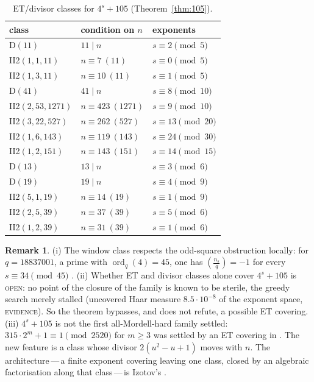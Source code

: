 \documentclass[11pt,reqno]{amsart}
\theoremstyle{definition}
\newtheorem{remark}[theorem]{Remark}
\newcommand{\ord}{\operatorname{ord}}
\newcommand{\leg}[2]{\left(\frac{#1}{#2}\right)}
\newcommand{\status}[1]{\textup{\textsc{#1}}}
\begin{document}
\begin{table}[ht]
\centering\small
\begin{tabular}{lll}
\toprule
class & condition on $n$ & exponents\\
\midrule
D$(11)$ & $11\mid n$ & $s\equiv 2\pmod{5}$ \\
II2$(1,1,11)$ & $n\equiv7\ (11)$ & $s\equiv 0\pmod{5}$ \\
II2$(1,3,11)$ & $n\equiv10\ (11)$ & $s\equiv 1\pmod{5}$ \\
D$(41)$ & $41\mid n$ & $s\equiv 8\pmod{10}$ \\
II2$(2,53,1271)$ & $n\equiv423\ (1271)$ & $s\equiv 9\pmod{10}$ \\
II2$(3,22,527)$ & $n\equiv262\ (527)$ & $s\equiv 13\pmod{20}$ \\
II2$(1,6,143)$ & $n\equiv119\ (143)$ & $s\equiv 24\pmod{30}$ \\
II2$(1,2,151)$ & $n\equiv143\ (151)$ & $s\equiv 14\pmod{15}$ \\
D$(13)$ & $13\mid n$ & $s\equiv 3\pmod{6}$ \\
D$(19)$ & $19\mid n$ & $s\equiv 4\pmod{9}$ \\
II2$(5,1,19)$ & $n\equiv14\ (19)$ & $s\equiv 1\pmod{9}$ \\
II2$(2,5,39)$ & $n\equiv37\ (39)$ & $s\equiv 5\pmod{6}$ \\
II2$(1,2,39)$ & $n\equiv31\ (39)$ & $s\equiv 1\pmod{6}$ \\
\bottomrule
\end{tabular}
\caption{ET/divisor classes for $4^s+105$ (Theorem~\ref{thm:105}).}\label{tab:105}
\end{table}

\begin{remark}\label{rem:105}
(i) The window class respects the odd-square obstruction locally: for
$q=18837001$, a prime with $\ord_q(4)=45$, one has $\leg{n_s}q=-1$ for every
$s\equiv34\pmod{45}$ \cite[review R246]{Sparks6}.  (ii) Whether
ET and divisor classes alone cover $4^s+105$ is \status{open}: no point of
the closure of the family is known to be sterile, the greedy search merely
stalled (uncovered Haar measure $8.5\cdot10^{-8}$ of the exponent space,
\status{evidence}).  So the theorem bypasses, and does not refute, a possible
ET covering.  (iii) $4^s+105$ is not the first all-Mordell-hard family
settled: $315\cdot2^m+1\equiv1\pmod{2520}$ for $m\ge3$ was settled by an ET
covering in \cite{ExpCov}.  The new feature is a class whose divisor
$2(u^2-u+1)$ moves with $n$.  The architecture\,---\,a finite exponent
covering leaving one class, closed by an algebraic factorisation along that
class\,---\,is Izotov's \cite{Izotov,FFK}.
\end{remark}
\end{document}
